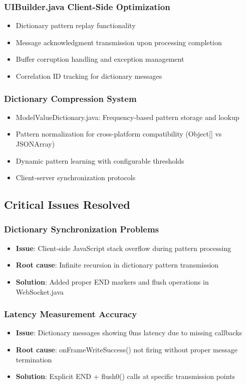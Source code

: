 \documentclass[12pt,a4paper]{article}
\begin{document}
\subsubsection{UIBuilder.java Client-Side Optimization}
\begin{itemize}
    \item Dictionary pattern replay functionality
    \item Message acknowledgment transmission upon processing completion
    \item Buffer corruption handling and exception management
    \item Correlation ID tracking for dictionary messages
\end{itemize}

\subsubsection{Dictionary Compression System}
\begin{itemize}
    \item ModelValueDictionary.java: Frequency-based pattern storage and lookup
    \item Pattern normalization for cross-platform compatibility (Object[] vs JSONArray)
    \item Dynamic pattern learning with configurable thresholds
    \item Client-server synchronization protocols
\end{itemize}

\subsection{Critical Issues Resolved}

\subsubsection{Dictionary Synchronization Problems}
\begin{itemize}
    \item \textbf{Issue}: Client-side JavaScript stack overflow during pattern processing
    \item \textbf{Root cause}: Infinite recursion in dictionary pattern transmission
    \item \textbf{Solution}: Added proper END markers and flush operations in WebSocket.java
\end{itemize}

\subsubsection{Latency Measurement Accuracy}
\begin{itemize}
    \item \textbf{Issue}: Dictionary messages showing 0ms latency due to missing callbacks
    \item \textbf{Root cause}: onFrameWriteSuccess() not firing without proper message termination
    \item \textbf{Solution}: Explicit END + flush0() calls at specific transmission points
\end{itemize}
\end{document}
